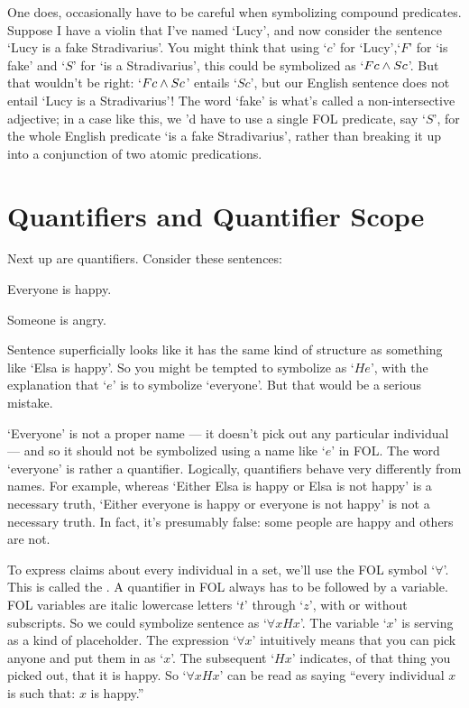 One does, occasionally  have to be careful when symbolizing compound predicates.  Suppose I have a violin that I've named `Lucy', and now consider the sentence `Lucy is a fake Stradivarius'.  You might think that using `$c$' for `Lucy',`$F$' for `\blank is fake' and `$S$' for `\blank is a Stradivarius', this could be symbolized as `$Fc \wedge Sc$'.  But that wouldn't be right: `$Fc \wedge Sc$' entails `$Sc$', but our English sentence does not entail `Lucy is a Stradivarius'!  The word `fake' is what's called a non-intersective adjective; in a case like this, we 'd have to use a single FOL predicate, say `$S$', for the  whole English predicate `\blank is a fake Stradivarius', rather than breaking it up into a conjunction of two atomic predications.


\section{Quantifiers and Quantifier Scope}\label{s:Quantifiers}
Next up are quantifiers. Consider these sentences:
	\begin{earg}
		\item[\ex{q.a}] Everyone is happy.
		\item[\ex{q.e}] Someone is angry.
	\end{earg}
Sentence  superficially looks like it has the same kind of structure as something like `Elsa is happy'.  So you might be tempted to symbolize  as `$He$', with the explanation that `$e$' is to symbolize `everyone'.  But that would be a serious mistake.

`Everyone' is not a proper name --- it doesn't pick out any particular individual --- and so it should not be symbolized using a name like `$e$' in FOL.  The word `everyone' is rather a quantifier.  Logically, quantifiers behave very differently from names.  For example, whereas `Either Elsa is happy or Elsa is not happy' is a necessary truth, `Either everyone is happy or everyone is not happy' is not a necessary truth.  In fact, it's presumably false: some people are happy and others are not.

To express claims about every individual in a set, we'll use the FOL symbol `$\forall$'.  This is called the .  A quantifier in FOL always has to be followed by a variable. FOL variables are italic lowercase letters `$t$' through `$z$', with or without subscripts. So we could symbolize sentence  as `$\forall x Hx$'.  The variable `$x$' is serving as a kind of placeholder. The expression `$\forall x$' intuitively means that you can pick anyone and put them in as `$x$'. The subsequent `$Hx$' indicates, of that thing you picked out, that it is happy.  So `$\forall x Hx$' can be read as saying ``every individual $x$ is such that: $x$ is happy.''

